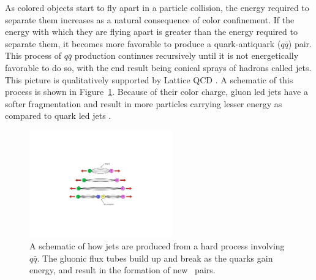 
As colored objects start to fly apart in a particle collision, the energy required to separate them increases as a natural consequence of color confinement.
If the energy with which they are flying apart is greater than the energy required to separate them, it becomes more favorable to produce a quark-antiquark ($q\bar{q}$) pair.
This process of $q \bar{q}$ production continues recursively until it is not energetically favorable to do so, with the end result being conical sprays of hadrons called jets.
This picture is qualitatively supported by Lattice QCD \cite{PhysRevD.71.114513}. 
A schematic of this process is shown in Figure~\ref{fig:qqbar_to_jet}.
Because of their color charge, gluon led jets have a softer fragmentation and result in more particles carrying lesser energy as compared to quark led jets \cite{Abbiendi:1999pi}.

\begin{figure}[htbp]
\begin{center}
\includegraphics[width=0.55\textwidth]{figures/theory/qqbar_to_jet}
\caption{A schematic of how jets are produced from a hard process involving $q \bar{q}$. The gluonic flux tubes build up and break as the quarks gain energy, and result in the formation of new \qqbar\ pairs.}
\label{fig:qqbar_to_jet}
\end{center}
\end{figure}



